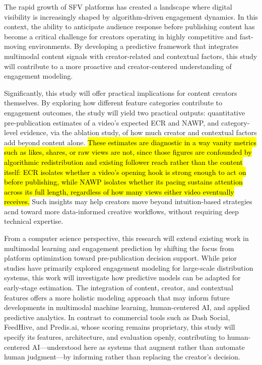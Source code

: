 
The rapid growth of SFV platforms has created a landscape where digital visibility is increasingly shaped by algorithm-driven engagement dynamics. In this context, the ability to anticipate audience response before publishing content has become a critical challenge for creators operating in highly competitive and fast-moving environments. By developing a predictive framework that integrates multimodal content signals with creator-related and contextual factors, this study will contribute to a more proactive and creator-centered understanding of engagement modeling.

Significantly, this study will offer practical implications for content creators themselves. By exploring how different feature categories contribute to engagement outcomes, the study will yield two practical outputs: quantitative pre-publication estimates of a video's expected ECR and NAWP, and category-level evidence, via the ablation study, of how much creator and contextual factors add beyond content alone. \hl{These estimates are diagnostic in a way vanity metrics such as likes, shares, or raw views are not, since those figures are confounded by algorithmic redistribution and existing follower reach rather than the content itself: ECR isolates whether a video's opening hook is strong enough to act on before publishing, while NAWP isolates whether its pacing sustains attention across its full length, regardless of how many views either video eventually receives.} Such insights may help creators move beyond intuition-based strategies acnd toward more data-informed creative workflows, without requiring deep technical expertise.

From a computer science perspective, this research will extend existing work in multimodal learning and engagement prediction by shifting the focus from platform optimization toward pre-publication decision support. While prior studies have primarily explored engagement modeling for large-scale distribution systems, this work will investigate how predictive models can be adapted for early-stage estimation. The integration of content, creator, and contextual features offers a more holistic modeling approach that may inform future developments in multimodal machine learning, human-centered AI, and applied predictive analytics. In contrast to commercial tools such as
Dash Social,
FeedHive,
and Predis.ai, whose scoring remains proprietary, this study will specify its features, architecture, and evaluation openly, contributing to human-centered AI—understood here as systems that augment rather than automate human judgment—by informing rather than replacing the creator's decision.

